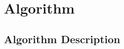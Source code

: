 \chapter{Algorithm}
\label{chapter: algorithm}
\setlength{\parskip}{12pt}

\section{Algorithm Description}
